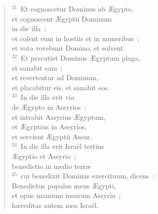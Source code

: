 \begin{verse}
${}^{21}$~Et cognoscetur Dominus ab \AE gypto,\\ et cognoscent \AE gyptii Dominum\\ in die illa~;\\ et colent eum in hostiis et in muneribus~;\\ et vota vovebunt Domino, et solvent.\\
${}^{22}$~Et percutiet Dominus \AE gyptum plaga,\\ et sanabit eam~;\\ et revertentur ad Dominum,\\ et placabitur eis, et sanabit eos.\\
${}^{23}$~In die illa erit via\\ de \AE gypto in Assyrios~;\\ et intrabit Assyrius \AE gyptum,\\ et \AE gyptius in Assyrios,\\ et servient \AE gyptii Assur.\\
${}^{24}$~In die illa erit Isra\"el tertius\\ \AE gyptio et Assyrio~;\\ benedictio in medio terr\ae \\
${}^{25}$~cui benedixit Dominus exercituum, dicens~:\\ Benedictus populus meus \AE gypti,\\ et opus manuum mearum Assyrio~;\\ h\ae reditas autem mea Isra\"el.\end{verse}



